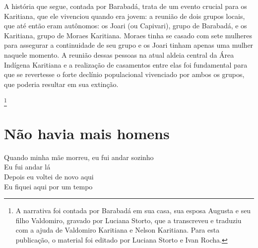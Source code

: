 \thispagestyle{empty}
\mbox{}
\vfill
\noindent{}A história que segue, contada por Barabadá, trata de um evento crucial para os Karitiana, que ele vivenciou quando era jovem: a reunião de dois grupos locais, que até então eram autônomos: os Joari (ou Capivari), grupo de Barabadá, e os Karitiana, grupo de Moraes Karitiana. Moraes tinha se casado com sete mulheres para assegurar a continuidade de seu grupo e os Joari tinham apenas uma mulher naquele momento. A reunião dessas pessoas na atual aldeia central da Área Indígena Karitiana e a realização de casamentos entre elas foi fundamental para que se revertesse o forte declínio populacional vivenciado por ambos os grupos, que poderia resultar em sua extinção.

\footnote{A narrativa foi contada por Barabadá em sua casa, sua esposa Augusta e seu filho Valdomiro, gravado por Luciana Storto, que a transcreveu e traduziu com a ajuda de Valdomiro Karitiana e Nelson Karitiana. Para esta publicação, o material foi editado por Luciana Storto e Ivan Rocha.}
\pagebreak


\chapter*{Não havia mais homens} 

\begin{linenumbers}\begingroup\raggedright
  \noindent Quando minha mãe morreu, eu fui andar sozinho\\
  Eu fui andar lá\\
  Depois eu voltei de novo aqui\\
  Eu fiquei aqui por um tempo
 
\end{linenumbers}\endgroup

